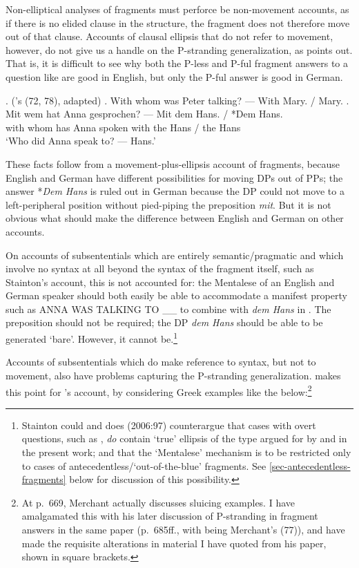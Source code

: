 \documentclass[doublespace]{umthesis}
\begin{document}
Non-elliptical analyses of fragments must perforce be non-movement accounts, as if there is no elided clause in the structure, the fragment does not therefore move out of that clause. Accounts of clausal ellipsis that do not refer to movement, however, do not give us a handle on the P-stranding generalization, as \cite{Me04, Me10} points out. That is, it is difficult to see why both the P-less and P-ful fragment answers to a question like \Next are good in English, but only the P-ful answer is good in German.

\ex. 		(\cite{Me04}'s (72, 78), adapted) 
	\a. With whom was Peter talking? --- With Mary. / Mary. \label{p-stranding-good-in-Eng}
	\bg. Mit wem hat Anna gesprochen? --- Mit dem Hans. / *Dem Hans. \\
		with whom has Anna spoken {} with the Hans / the Hans \\
		`Who did Anna speak to? --- Hans.'

These facts follow from a movement-plus-ellipsis account of fragments, because English and German have different possibilities for moving DPs out of PPs; the answer *{\it Dem Hans} is ruled out in German because the DP could not move to a left-peripheral position without pied-piping the preposition {\it mit}. But it is not obvious what should make the difference between English and German on other accounts.

On accounts of subsententials which are entirely semantic/pragmatic and which involve no syntax at all beyond the syntax of the fragment itself, such as Stainton's account, this is not accounted for: the Mentalese of an English and German speaker should both easily be able to accommodate a manifest property such as ANNA WAS TALKING TO \_\_ to combine with {\it dem Hans} in \Last[b]. The preposition should not be required; the DP {\it dem Hans} should be able to be generated `bare'. However, it cannot be.\footnote{Stainton could and does (2006:97) counterargue that cases with overt questions, such as \Last, \emph{do} contain `true' ellipsis of the type argued for by \cite{Me04} and in the present work; and that the `Mentalese' mechanism is to be restricted only to cases of antecedentless/`out-of-the-blue' fragments. See \ref{sec-antecedentless-fragments} below for discussion of this possibility.}

Accounts of subsententials which do make reference to syntax, but not to movement, also have problems capturing the P-stranding generalization. \cite[669f.]{Me04} makes this point for \cite{GS00}'s account, by considering Greek examples like the below:\footnote{At p.~669, Merchant actually discusses sluicing examples. I have amalgamated this with his later discussion of P-stranding in fragment answers in the same paper (p.~685ff., with \TextNext being Merchant's (77)), and have made the requisite alterations in material I have quoted from his paper, shown in square brackets.}
\end{document}
